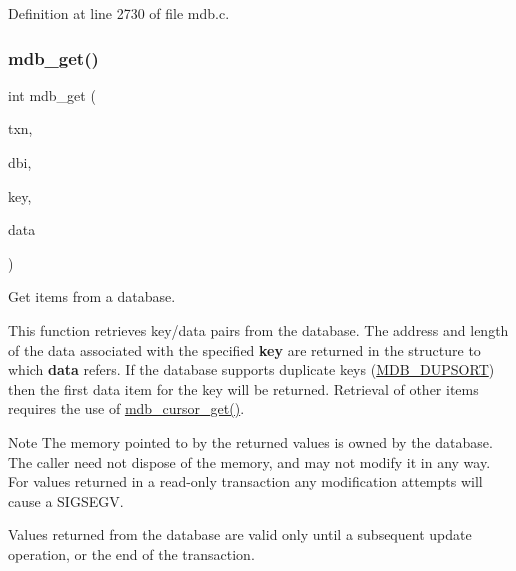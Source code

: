 Definition at line 2730 of file mdb.\+c.

\mbox{\label{group__mdb_ga8bf10cd91d3f3a83a34d04ce6b07992d}} 
\subsubsection{\texorpdfstring{mdb\+\_\+get()}{mdb\_get()}}
{\footnotesize\ttfamily int mdb\+\_\+get (\begin{DoxyParamCaption}\item[{\mbox{\hyperlink{struct_m_d_b__txn}{M\+D\+B\+\_\+txn}} $\ast$}]{txn,  }\item[{\mbox{\hyperlink{group__mdb_gadbe68a06c448dfb62da16443d251a78b}{M\+D\+B\+\_\+dbi}}}]{dbi,  }\item[{\mbox{\hyperlink{struct_m_d_b__val}{M\+D\+B\+\_\+val}} $\ast$}]{key,  }\item[{\mbox{\hyperlink{struct_m_d_b__val}{M\+D\+B\+\_\+val}} $\ast$}]{data }\end{DoxyParamCaption})}



Get items from a database. 

This function retrieves key/data pairs from the database. The address and length of the data associated with the specified {\bfseries key} are returned in the structure to which {\bfseries data} refers. If the database supports duplicate keys (\mbox{\hyperlink{group__mdb__dbi__open_gae0626566c2562e9007f5c8c9535bab1a}{M\+D\+B\+\_\+\+D\+U\+P\+S\+O\+RT}}) then the first data item for the key will be returned. Retrieval of other items requires the use of \mbox{\hyperlink{group__mdb_ga48df35fb102536b32dfbb801a47b4cb0}{mdb\+\_\+cursor\+\_\+get()}}.

\begin{DoxyNote}{Note}
The memory pointed to by the returned values is owned by the database. The caller need not dispose of the memory, and may not modify it in any way. For values returned in a read-\/only transaction any modification attempts will cause a S\+I\+G\+S\+E\+GV. 

Values returned from the database are valid only until a subsequent update operation, or the end of the transaction. 
\end{DoxyNote}

